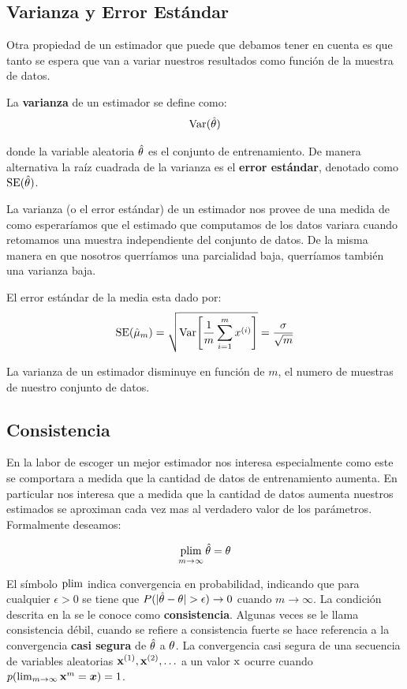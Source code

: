 \subsection{Varianza y Error Estándar}
Otra propiedad de un estimador que puede que debamos tener en cuenta es que tanto se espera que van a variar nuestros resultados como función de la muestra de datos.

La \textbf{varianza} de un estimador se define como:
\begin{equation}
  \mathrm{Var}(\hat{{\mathbf{\theta}}})
\end{equation}

donde la variable aleatoria $\hat{{\mathbf{\theta}}}$ es el conjunto de entrenamiento. De manera alternativa la raíz cuadrada de la varianza es el \textbf{error estándar}, denotado como $\mathrm{SE}(\hat{{\mathbf{\theta}}})$.

La varianza (o el error estándar) de un estimador nos provee de una medida de como esperaríamos que el estimado que computamos de los datos variara cuando retomamos una muestra independiente del conjunto de datos. De la misma manera en que nosotros querríamos una parcialidad baja, querríamos también una varianza baja.

El error estándar de la media esta dado por:
\begin{equation}
  \mathrm{SE}(\hat{\mu}_m) = \sqrt{ \mathrm{Var}{\Bigg[ \frac{1}{m} \sum_{i=1}^{m} x^{(i)} \Bigg]} } = \frac{\sigma}{\sqrt{m}}
\end{equation}
    
La varianza de un estimador disminuye en función de $m$, el numero de muestras de nuestro conjunto de datos.

\subsection{Consistencia}
En la labor de escoger un mejor estimador nos interesa especialmente como este se comportara a medida que la cantidad de datos de entrenamiento aumenta. En particular nos interesa que a medida que la cantidad de datos aumenta nuestros estimados se aproximan cada vez mas al verdadero valor de los parámetros. Formalmente deseamos:

\begin{equation} \label{eq:consistency}
  \operatorname*{plim}_{m\to\infty} \hat{{\mathbf{\theta}}} = {\mathbf{\theta}}
\end{equation}

El símbolo $\operatorname*{plim}$ indica convergencia en probabilidad, indicando que para cualquier $\epsilon > 0$ se tiene que $P(|\hat{{\mathbf{\theta}}} - {\mathbf{\theta}}| > \epsilon) \to 0$ cuando $m \to \infty$. La condición descrita en la  se le conoce como \textbf{consistencia}. Algunas veces se le llama consistencia débil, cuando se refiere a consistencia fuerte se hace referencia a la convergencia \textbf{casi segura} de $\hat{{\mathbf{\theta}}}$ a ${\mathbf{\theta}}$. La convergencia casi segura de una secuencia de variables aleatorias ${\mathbf{x}}^{(1)}, {\mathbf{x}}^{(2)}, \ldots$ a un valor ${\textnormal{x}}$ ocurre cuando $p(\lim_{m\to\infty}{\mathbf{x}}^{m} = {\bm{x}}) = 1$.

